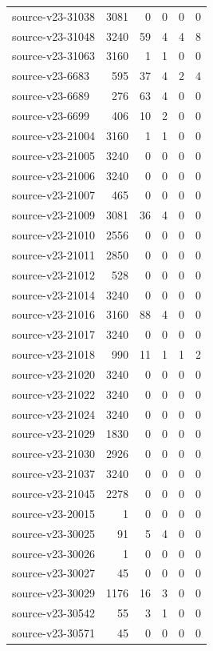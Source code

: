 \begin{longtable}{p{}rrrrr}
source-v23-31038 & 3081 & 0 & 0 & 0 & 0\\
source-v23-31048 & 3240 & 59 & 4 & 4 & 8\\
source-v23-31063 & 3160 & 1 & 1 & 0 & 0\\
source-v23-6683 & 595 & 37 & 4 & 2 & 4\\
source-v23-6689 & 276 & 63 & 4 & 0 & 0\\
source-v23-6699 & 406 & 10 & 2 & 0 & 0\\
source-v23-21004 & 3160 & 1 & 1 & 0 & 0\\
source-v23-21005 & 3240 & 0 & 0 & 0 & 0\\
source-v23-21006 & 3240 & 0 & 0 & 0 & 0\\
source-v23-21007 & 465 & 0 & 0 & 0 & 0\\
source-v23-21009 & 3081 & 36 & 4 & 0 & 0\\
source-v23-21010 & 2556 & 0 & 0 & 0 & 0\\
source-v23-21011 & 2850 & 0 & 0 & 0 & 0\\
source-v23-21012 & 528 & 0 & 0 & 0 & 0\\
source-v23-21014 & 3240 & 0 & 0 & 0 & 0\\
source-v23-21016 & 3160 & 88 & 4 & 0 & 0\\
source-v23-21017 & 3240 & 0 & 0 & 0 & 0\\
source-v23-21018 & 990 & 11 & 1 & 1 & 2\\
source-v23-21020 & 3240 & 0 & 0 & 0 & 0\\
source-v23-21022 & 3240 & 0 & 0 & 0 & 0\\
source-v23-21024 & 3240 & 0 & 0 & 0 & 0\\
source-v23-21029 & 1830 & 0 & 0 & 0 & 0\\
source-v23-21030 & 2926 & 0 & 0 & 0 & 0\\
source-v23-21037 & 3240 & 0 & 0 & 0 & 0\\
source-v23-21045 & 2278 & 0 & 0 & 0 & 0\\
source-v23-20015 & 1 & 0 & 0 & 0 & 0\\
source-v23-30025 & 91 & 5 & 4 & 0 & 0\\
source-v23-30026 & 1 & 0 & 0 & 0 & 0\\
source-v23-30027 & 45 & 0 & 0 & 0 & 0\\
source-v23-30029 & 1176 & 16 & 3 & 0 & 0\\
source-v23-30542 & 55 & 3 & 1 & 0 & 0\\
source-v23-30571 & 45 & 0 & 0 & 0 & 0\\

\end{longtable}
